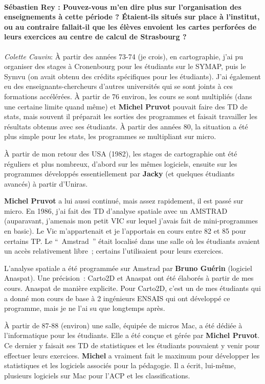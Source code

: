 \paragraph*{Sébastien Rey : Pouvez-vous m'en dire plus sur l'organisation des enseignements à cette période ? Étaient-ils situés sur place à l'institut, ou au contraire fallait-il que les élèves envoient les cartes perforées de leurs exercices au centre de calcul de Strasbourg ?}

\noindent\emph{Colette Cauvin}: À partir des années 73-74 (je crois), en cartographie, j’ai pu organiser des stages à Cronenbourg pour les étudiants sur le SYMAP, puis le Symvu (on avait obtenu des crédits spécifiques pour les étudiants). J’ai également eu des enseignants-chercheurs d’autres universités qui se sont joints à ces formations accélérées. À partir de 76 environ, les cours se sont multipliés (dans une certaine limite quand même) et \textbf{Michel Pruvot} pouvait faire des TD de stats, mais souvent il préparait les sorties des programmes et faisait travailler les résultats obtenus avec ses étudiants. À partir des années 80, la situation a été plus simple pour les stats, les programmes se multipliant sur micro.

À partir de mon retour des USA (1982), les stages de cartographie ont été réguliers et plus nombreux, d’abord sur les mêmes logiciels, ensuite sur les programmes développés essentiellement par \textbf{Jacky} (et quelques étudiants avancés) à partir d’Uniras. 

\textbf{Michel Pruvot} a lui aussi continué, mais assez rapidement, il est passé sur micro. En 1986, j’ai fait des TD d’analyse spatiale avec un AMSTRAD (auparavant, j’amenais mon petit VIC sur lequel j’avais fait de mini-programmes en basic). Le Vic m’appartenait et je l’apportais en cours entre 82 et 85 pour certains TP. Le \enquote{ Amstrad } était localisé dans une salle où les étudiants avaient un accès relativement libre ; certains l’utilisaient pour leurs exercices.

L’analyse spatiale a été programmée sur Amstrad par \textbf{Bruno Guérin} (logiciel Anaspat). Une précision : Carto2D et Anaspat ont été élaborés à partir de mes cours. Anaspat de manière explicite. Pour Carto2D, c’est un de mes étudiants qui a donné mon cours de base à 2 ingénieurs ENSAIS qui ont développé ce programme, mais je ne l’ai su que longtemps après. 

À partir de 87-88 (environ) une salle, équipée de micros Mac, a été dédiée à l’informatique pour les étudiants. Elle a été conçue et gérée par \textbf{Michel Pruvot}. Ce dernier y faisait ses TD de statistiques et les étudiants pouvaient y venir pour effectuer leurs exercices. \textbf{Michel} a vraiment fait le maximum pour développer les statistiques et les logiciels associés pour la pédagogie. Il a écrit, lui-même, plusieurs logiciels sur Mac pour l’ACP et les classifications.

